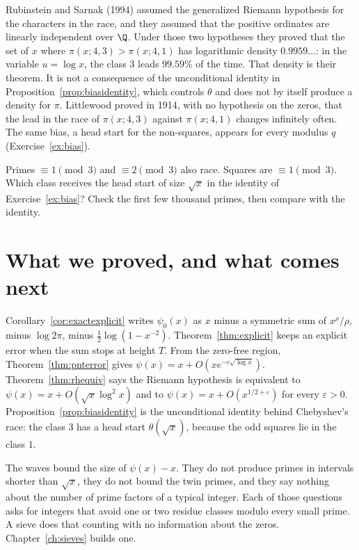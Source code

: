 Rubinstein and Sarnak (1994) assumed the generalized Riemann hypothesis for the characters in the race, and they assumed that the positive ordinates are linearly independent over $\Q$. Under those two hypotheses they proved that the set of $x$ where $\pi(x;4,3)>\pi(x;4,1)$ has logarithmic density $0.9959\ldots$: in the variable $u=\log x$, the class $3$ leads $99.59\%$ of the time. That density is their theorem. It is not a consequence of the unconditional identity in Proposition~\ref{prop:biasidentity}, which controls $\theta$ and does not by itself produce a density for $\pi$. Littlewood proved in 1914, with no hypothesis on the zeros, that the lead in the race of $\pi(x;4,3)$ against $\pi(x;4,1)$ changes infinitely often. The same bias, a head start for the non-squares, appears for every modulus $q$ (Exercise~\ref{ex:bias}).

\begin{think}
Primes $\equiv1\pmod3$ and $\equiv2\pmod3$ also race. Squares are $\equiv1\pmod3$. Which class receives the head start of size $\sqrt x$ in the identity of Exercise~\ref{ex:bias}? Check the first few thousand primes, then compare with the identity.
\end{think}

\section{What we proved, and what comes next}

Corollary~\ref{cor:exactexplicit} writes $\psi_0(x)$ as $x$ minus a symmetric sum of $x^\rho/\rho$, minus $\log2\pi$, minus $\frac12\log(1-x^{-2})$. Theorem~\ref{thm:explicit} keeps an explicit error when the sum stops at height $T$. From the zero-free region, Theorem~\ref{thm:pnterror} gives $\psi(x)=x+O(xe^{-c\sqrt{\log x}})$. Theorem~\ref{thm:rhequiv} says the Riemann hypothesis is equivalent to $\psi(x)=x+O(\sqrt x\log^2x)$ and to $\psi(x)=x+O(x^{1/2+\varepsilon})$ for every $\varepsilon>0$. Proposition~\ref{prop:biasidentity} is the unconditional identity behind Chebyshev's race: the class $3$ has a head start $\theta(\sqrt x)$, because the odd squares lie in the class $1$.

The waves bound the size of $\psi(x)-x$. They do not produce primes in intervals shorter than $\sqrt x$, they do not bound the twin primes, and they say nothing about the number of prime factors of a typical integer. Each of those questions asks for integers that avoid one or two residue classes modulo every small prime. A sieve does that counting with no information about the zeros. Chapter~\ref{ch:sieves} builds one.

